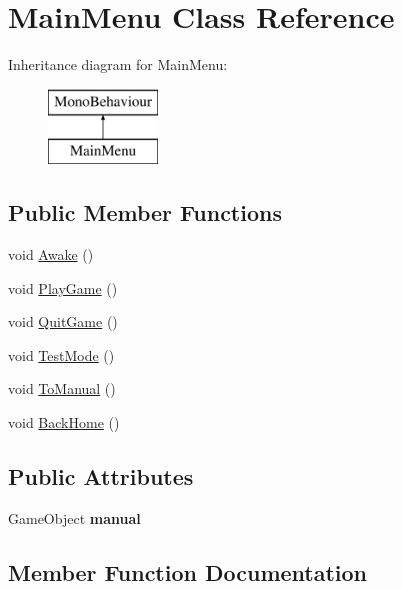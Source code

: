 \hypertarget{class_main_menu}{}\section{Main\+Menu Class Reference}
\label{class_main_menu}
Inheritance diagram for Main\+Menu\+:\begin{figure}[H]
\begin{center}
\leavevmode
\includegraphics[height=2.000000cm]{class_main_menu}
\end{center}
\end{figure}
\subsection*{Public Member Functions}
\begin{DoxyCompactItemize}
\item 
void \mbox{\hyperlink{class_main_menu_a9a2b50b76ed50c4fc1eb08eba7dc23b2}{Awake}} ()
\item 
void \mbox{\hyperlink{class_main_menu_a11d7e3cd6b90cf59659e03e830e02db5}{Play\+Game}} ()
\item 
void \mbox{\hyperlink{class_main_menu_a485db7cf60c0b93ecc87b9273bcce78b}{Quit\+Game}} ()
\item 
void \mbox{\hyperlink{class_main_menu_a0d0cf4bf03eb9fc4bfcbaef384b6a42e}{Test\+Mode}} ()
\item 
void \mbox{\hyperlink{class_main_menu_a8286e477a22df9031ff4aea9431864ef}{To\+Manual}} ()
\item 
void \mbox{\hyperlink{class_main_menu_ac08c5e57bb188cc5612d644e676245e0}{Back\+Home}} ()
\end{DoxyCompactItemize}
\subsection*{Public Attributes}
\begin{DoxyCompactItemize}
\item 
\mbox{\label{class_main_menu_ace51aaeb1e02e402ed09dea424196c4f}} 
Game\+Object {\bfseries manual}
\end{DoxyCompactItemize}


\subsection{Member Function Documentation}
\mbox{\label{class_main_menu_a9a2b50b76ed50c4fc1eb08eba7dc23b2}} 
